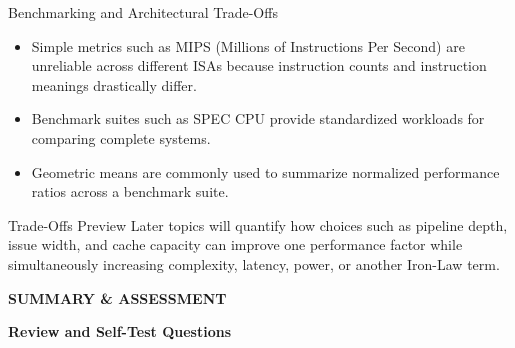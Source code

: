 \documentclass[aspectratio=169,11pt,t]{beamer}
\begin{document}
\begin{frame}{Benchmarking and Architectural Trade-Offs}

\begin{itemize}\setlength{\itemsep}{5pt}
  \item Simple metrics such as MIPS (Millions of Instructions Per Second) are unreliable across different ISAs because instruction counts and instruction meanings drastically differ.
  \item Benchmark suites such as SPEC CPU provide standardized workloads for comparing complete systems.
  \item Geometric means are commonly used to summarize normalized performance ratios across a benchmark suite.
\end{itemize}

\vfill

\begin{block}{Trade-Offs Preview}
Later topics will quantify how choices such as pipeline depth, issue width, and cache capacity can improve one performance factor while simultaneously increasing complexity, latency, power, or another Iron-Law term.
\end{block}

\end{frame}







\begin{frame}[plain]


\vspace*{\fill}

\begin{minipage}{0.94\textwidth}
\raggedright
{}

{\color{gold}\large\bfseries SUMMARY \& ASSESSMENT\par}

\vspace{0.3cm}

{\color{white}\fontsize{22}{26}\selectfont\bfseries
Review and Self-Test Questions\par}

\end{minipage}

\vspace*{\fill}

\end{frame}
\end{document}
